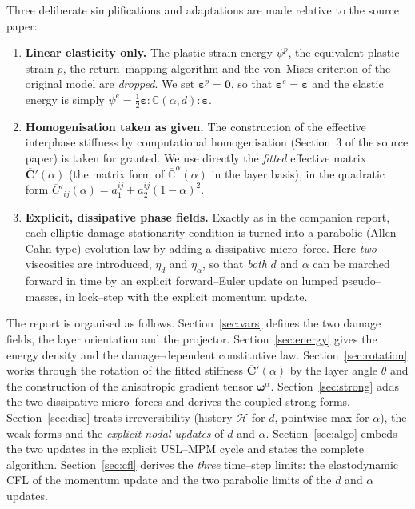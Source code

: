 \documentclass[12pt,a4paper]{article}
\newcommand{\eng}[1]{#1}
\newcommand{\beps}{\boldsymbol{\varepsilon}}
\newcommand{\bomega}{\boldsymbol{\omega}}
\newcommand{\Cp}{\overline{\mathbf{C}}'}             %
\newcommand{\Cad}{\mathbb{C}(\alpha,d)}              %
\begin{document}
	Three deliberate simplifications and adaptations are made relative to the
	source paper:
	\begin{enumerate}
		\item \textbf{Linear elasticity only.} The plastic strain energy
		$\psi^p$, the equivalent plastic strain $p$, the return--mapping algorithm
		and the von~Mises criterion of the original model are \emph{dropped}.
		We set $\beps^p=\mathbf{0}$, so that $\beps^e=\beps$ and the elastic energy
		is simply $\psi^e=\tfrac12\beps:\Cad:\beps$.
		\item \textbf{Homogenisation taken as given.} The construction of the
		effective interphase stiffness by computational homogenisation
		(Section~3 of the source paper) is taken for granted. We use directly the
		\emph{fitted} effective matrix $\Cp(\alpha)$ (the matrix form of
		$\overline{\mathbb{C}}^{\alpha}(\alpha)$ in the layer basis), in the
		quadratic form $\overline{C}'_{ij}(\alpha)=a_1^{ij}+a_2^{ij}(1-\alpha)^2$.
		\item \textbf{Explicit, dissipative phase fields.} Exactly as in the
		companion report, each elliptic damage stationarity condition is turned into
		a parabolic (Allen--Cahn type) evolution law by adding a dissipative
		micro--force. Here \emph{two} viscosities are introduced, $\eta_d$ and
		$\eta_\alpha$, so that \emph{both} $d$ and $\alpha$ can be marched forward in
		time by an explicit forward--Euler update on lumped pseudo--masses, in
		lock--step with the explicit momentum update.
	\end{enumerate}

	The report is organised as follows.
	Section~\ref{sec:vars} defines the two damage fields, the layer orientation and
	the projector. Section~\ref{sec:energy} gives the energy density and the
	damage--dependent constitutive law. Section~\ref{sec:rotation} works through the
	rotation of the fitted stiffness $\Cp(\alpha)$ by the layer angle $\theta$ and
	the construction of the anisotropic gradient tensor $\bomega^{\alpha}$.
	Section~\ref{sec:strong} adds the two dissipative micro--forces and derives the
	coupled strong forms. Section~\ref{sec:disc} treats irreversibility (history
	$\mathcal{H}$ for $d$, pointwise max for $\alpha$), the weak forms and the
	\emph{explicit nodal updates} of $d$ and $\alpha$. Section~\ref{sec:algo}
	embeds the two updates in the explicit \eng{USL--MPM} cycle and states the
	complete algorithm. Section~\ref{sec:cfl} derives the \emph{three} time--step
	limits: the elastodynamic CFL of the momentum update and the two parabolic
	limits of the $d$ and $\alpha$ updates.
\end{document}
